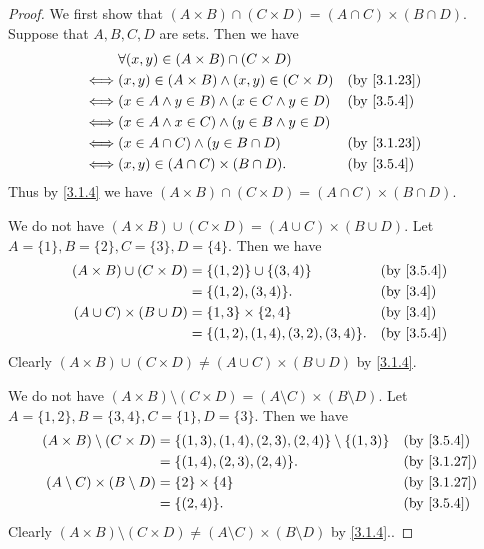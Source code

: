 \begin{proof}
  We first show that \((A \times B) \cap (C \times D) = (A \cap C) \times (B \cap D)\).
  Suppose that \(A, B, C, D\) are sets.
  Then we have
  \begin{align*}
         & \forall (x, y) \in (A \times B) \cap (C \times D)                                    \\
    \iff & (x, y) \in (A \times B) \land (x, y) \in (C \times D) &  & \text{(by \cref{3.1.23})} \\
    \iff & (x \in A \land y \in B) \land (x \in C \land y \in D) &  & \text{(by \cref{3.5.4})}  \\
    \iff & (x \in A \land x \in C) \land (y \in B \land y \in D)                                \\
    \iff & (x \in A \cap C) \land (y \in B \cap D)               &  & \text{(by \cref{3.1.23})} \\
    \iff & (x, y) \in (A \cap C) \times (B \cap D).              &  & \text{(by \cref{3.5.4})}
  \end{align*}
  Thus by \cref{3.1.4} we have \((A \times B) \cap (C \times D) = (A \cap C) \times (B \cap D)\).

  We do not have \((A \times B) \cup (C \times D) = (A \cup C) \times (B \cup D)\).
  Let \(A = \{1\}, B = \{2\}, C = \{3\}, D = \{4\}\).
  Then we have
  \begin{align*}
    (A \times B) \cup (C \times D) & = \{(1, 2)\} \cup \{(3, 4)\}          &  & \text{(by \cref{3.5.4})} \\
                                   & = \{(1, 2), (3, 4)\}.                 &  & \text{(by \cref{3.4})}   \\
    (A \cup C) \times (B \cup D)   & = \{1, 3\} \times \{2, 4\}            &  & \text{(by \cref{3.4})}   \\
                                   & = \{(1, 2), (1, 4), (3, 2), (3, 4)\}. &  & \text{(by \cref{3.5.4})}
  \end{align*}
  Clearly \((A \times B) \cup (C \times D) \neq (A \cup C) \times (B \cup D)\) by \cref{3.1.4}.

  We do not have \((A \times B) \setminus (C \times D) = (A \setminus C) \times (B \setminus D)\).
  Let \(A = \{1, 2\}, B = \{3, 4\}, C = \{1\}, D = \{3\}\).
  Then we have
  \begin{align*}
    (A \times B) \setminus (C \times D)    & = \{(1, 3), (1, 4), (2, 3), (2, 4)\} \setminus \{(1, 3)\} &  & \text{(by \cref{3.5.4})}  \\
                                           & = \{(1, 4), (2, 3), (2, 4)\}.                             &  & \text{(by \cref{3.1.27})} \\
    (A \setminus C) \times (B \setminus D) & = \{2\} \times \{4\}                                      &  & \text{(by \cref{3.1.27})} \\
                                           & = \{(2, 4)\}.                                             &  & \text{(by \cref{3.5.4})}
  \end{align*}
  Clearly \((A \times B) \setminus (C \times D) \neq (A \setminus C) \times (B \setminus D)\) by \cref{3.1.4}..
\end{proof}

